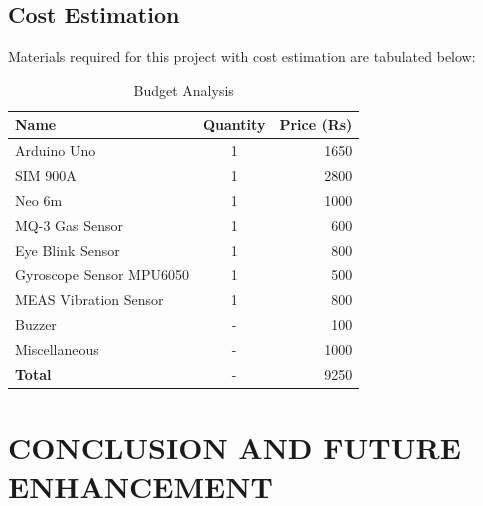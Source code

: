 \documentclass[12pt,a4paper]{report}
\begin{document}
\section{Cost Estimation}
Materials required for this project with cost estimation are tabulated below:\\
\begin{table}[h!]
\centering
\caption{ Budget Analysis}
\large
\begin{tabular}{| l | c | r |}
\hline
\textbf{Name} & \textbf{Quantity} & \textbf{Price (Rs)} \\
\hline
Arduino Uno & 1 & 1650 \\
\hline
SIM 900A & 1 & 2800 \\
\hline
Neo 6m & 1 & 1000\\
\hline
MQ-3 Gas Sensor & 1 & 600 \\
\hline
Eye Blink Sensor & 1 & 800 \\
\hline
Gyroscope Sensor MPU6050 & 1 & 500 \\
\hline
MEAS Vibration Sensor  & 1 & 800 \\
\hline
Buzzer & - & 100 \\
\hline
Miscellaneous & - & 1000 \\
\hline
\textbf{Total} & - & 9250 \\
\hline
\end{tabular}
\normalsize
\end{table}
\chapter{CONCLUSION AND FUTURE ENHANCEMENT}
\end{document}
